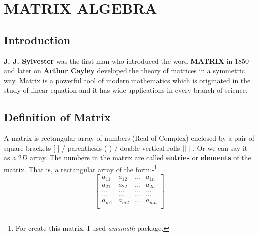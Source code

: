\documentclass[6 pt]{book}
\begin{document}
	\section*{MATRIX ALGEBRA}
		\subsection*{Introduction}
			\textbf{J. J. Sylvester} was the first man who introduced the word \textbf{MATRIX} in $1850$ and later on \textbf{Arthur Cayley} developed the theory of matrices in a symmetric way. Matrix is a powerful tool of modern mathematics which is originated in the study of linear equation and it has wide applications in every branch of science.
		\subsection*{Definition of Matrix}
			A matrix is rectangular array of numbers (Real of Complex) enclosed by a pair of square brackets [ ] / parenthesis ( ) / double vertical rolls $||\hspace{1mm}||$. Or we can say it as a $2D$ array. The numbers in the matrix are called \textbf{entries} or \textbf{elements} of the matrix. That is, a rectangular array of the form:-\footnote{For create this matrix, I used \textit{amsmath} package.}
			$$
			\begin{bmatrix} %
				a_{11} & a_{12} & \dots & a_{1n}\\
				a_{21} & a_{22} & \dots & a_{2n}\\
				\dots & \dots & \dots & \dots\\
				\dots & \dots & \dots & \dots\\
				a_{m1} & a_{m2} & \dots & a_{mn}\\
			\end{bmatrix}
			$$
\end{document}
